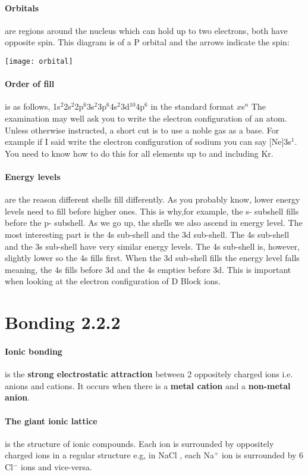 	\paragraph{Orbitals} are regions around the nucleus which can hold up to two electrons, both have opposite spin.
	This diagram is of a P orbital and the arrows indicate the spin:
    \begin{center}
    \texttt{[image: orbital]}
    \end{center}
    \paragraph{Order of fill} is as follows, 1s$^2$2s$^2$2p$^6$3s$^2$3p$^6$4s$^2$3d$^{10}$4p$^6$ in the standard format $x$s$^n$
    The examination may well ask you to write the electron configuration of an atom.
	Unless otherwise instructed, a short cut is to use a noble gas as a base.
	For example if I said write the electron configuration of sodium you can say [Ne]3s$^1$.
	You need to know how to do this for all elements up to and including Kr.
   \paragraph{Energy levels} are the reason different shells fill differently. 
   As you probably know, lower energy levels need to fill before higher ones.
   This is why,for example, the s- subshell fills before the p- subshell.
   As we go up, the shells we also ascend in energy level.
	The most interesting part is the 4s sub-shell and the 3d sub-shell.
	The 4s sub-shell and the 3s sub-shell have very similar energy levels.
	The 4s sub-shell is, however, slightly lower so the 4s fills first.
	When the 3d sub-shell fills the energy level falls meaning, the 4s fills before 3d and the 4s empties before 3d.
	This is important when looking at the electron configuration of D Block ions.
    \section{Bonding 2.2.2}
    \paragraph{Ionic bonding} is the \textbf{strong electrostatic attraction} between 2 oppositely charged ions i.e. anions and cations.
    It occurs when there is a \textbf{metal cation} and a \textbf{non-metal anion}.
    \paragraph{The giant ionic lattice} is the structure of ionic compounds. 
    Each ion is surrounded by oppositely charged ions in a regular structure e.g, in NaCl , each Na$^+$ ion is surrounded by 6 Cl$^-$ ions and vice-versa.
